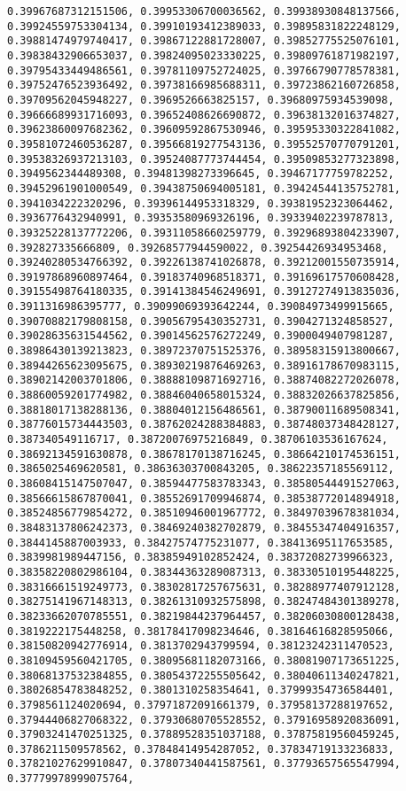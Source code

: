 \documentclass[11pt]{article}
\begin{document}
\begin{Verbatim}[commandchars=\\\{\}]
0.39967687312151506, 0.39953306700036562, 0.39938930848137566, 0.39924559753304134, 0.39910193412389033, 0.39895831822248129, 0.39881474979740417, 0.39867122881728007, 0.39852775525076101, 0.39838432906653037, 0.39824095023330225, 0.39809761871982197, 0.39795433449486561, 0.39781109752724025, 0.39766790778578381, 0.39752476523936492, 0.39738166985688311, 0.39723862160726858, 0.39709562045948227, 0.3969526663825157, 0.39680975934539098, 0.39666689931716093, 0.39652408626690872, 0.39638132016374827, 0.39623860097682362, 0.39609592867530946, 0.39595330322841082, 0.39581072460536287, 0.39566819277543136, 0.39552570770791201, 0.39538326937213103, 0.39524087773744454, 0.39509853277323898, 0.3949562344489308, 0.39481398273396645, 0.39467177759782252, 0.39452961901000549, 0.39438750694005181, 0.39424544135752781, 0.3941034222320296, 0.39396144953318329, 0.39381952323064462, 0.3936776432940991, 0.39353580969326196, 0.39339402239787813, 0.39325228137772206, 0.39311058660259779, 0.39296893804233907, 0.392827335666809, 0.39268577944590022, 0.39254426934953468, 0.39240280534766392, 0.39226138741026878, 0.39212001550735914, 0.39197868960897464, 0.39183740968518371, 0.39169617570608428, 0.39155498764180335, 0.39141384546249691, 0.39127274913835036, 0.3911316986395777, 0.39099069393642244, 0.39084973499915665, 0.39070882179808158, 0.39056795430352731, 0.3904271324858527, 0.39028635631544562, 0.39014562576272249, 0.3900049407981287, 0.38986430139213823, 0.38972370751525376, 0.38958315913800667, 0.38944265623095675, 0.38930219876469263, 0.38916178670983115, 0.38902142003701806, 0.38888109871692716, 0.38874082272026078, 0.38860059201774982, 0.38846040658015324, 0.38832026637825856, 0.38818017138288136, 0.38804012156486561, 0.38790011689508341, 0.38776015734443503, 0.38762024288384883, 0.38748037348428127, 0.387340549116717, 0.38720076975216849, 0.38706103536167624, 0.38692134591630878, 0.38678170138716245, 0.38664210174536151, 0.3865025469620581, 0.38636303700843205, 0.38622357185569112, 0.38608415147507047, 0.38594477583783343, 0.38580544491527063, 0.38566615867870041, 0.38552691709946874, 0.38538772014894918, 0.38524856779854272, 0.38510946001967772, 0.38497039678381034, 0.38483137806242373, 0.38469240382702879, 0.38455347404916357, 0.3844145887003933, 0.38427574775231077, 0.38413695117653585, 0.3839981989447156, 0.38385949102852424, 0.38372082739966323, 0.38358220802986104, 0.38344363289087313, 0.38330510195448225, 0.38316661519249773, 0.38302817257675631, 0.38288977407912128, 0.38275141967148313, 0.38261310932575898, 0.38247484301389278, 0.38233662070785551, 0.38219844237964457, 0.38206030800128438, 0.3819222175448258, 0.38178417098234646, 0.38164616828595066, 0.38150820942776914, 0.3813702943799594, 0.38123242311470523, 0.38109459560421705, 0.38095681182073166, 0.38081907173651225, 0.38068137532384855, 0.38054372255505642, 0.38040611340247821, 0.38026854783848252, 0.3801310258354641, 0.37999354736584401, 0.3798561124020694, 0.37971872091661379, 0.37958137288197652, 0.37944406827068322, 0.37930680705528552, 0.37916958920836091, 0.37903241470251325, 0.37889528351037188, 0.37875819560459245, 0.3786211509578562, 0.37848414954287052, 0.37834719133236833, 0.37821027629910847, 0.37807340441587561, 0.37793657565547994, 0.37779978999075764, 
\end{Verbatim}
\end{document}
